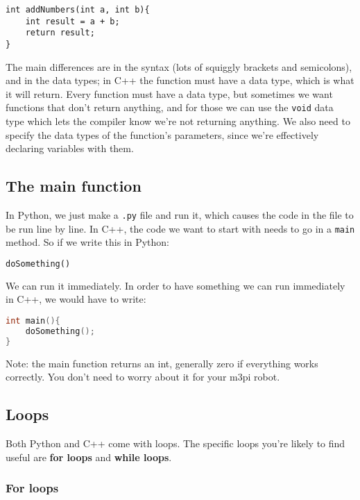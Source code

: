 \begin{lstlisting}
int addNumbers(int a, int b){
    int result = a + b;
    return result;
}
\end{lstlisting}

The main differences are in the syntax (lots of squiggly brackets and
semicolons), and in the data types; in C++ the function must have a data
type, which is what it will return. Every function must have a data
type, but sometimes we want functions that don't return anything, and
for those we can use the \lstinline!void! data type which lets the
compiler know we're not returning anything. We also need to specify the
data types of the function's parameters, since we're effectively
declaring variables with them.

\subsection{The main function}\label{the-main-function}

In Python, we just make a \lstinline!.py! file and run it, which causes
the code in the file to be run line by line. In C++, the code we want to
start with needs to go in a \lstinline!main! method. So if we write this
in Python:

\begin{lstlisting}[language=Python]
doSomething()
\end{lstlisting}

We can run it immediately. In order to have something we can run
immediately in C++, we would have to write:

\begin{lstlisting}[language={C++}]
int main(){
    doSomething();
}
\end{lstlisting}

Note: the main function returns an int, generally zero if everything
works correctly. You don't need to worry about it for your m3pi robot.

\subsection{Loops}\label{loops}

Both Python and C++ come with loops. The specific loops you're likely to
find useful are \textbf{for loops} and \textbf{while loops}.

\subsubsection{For loops}\label{for-loops}

